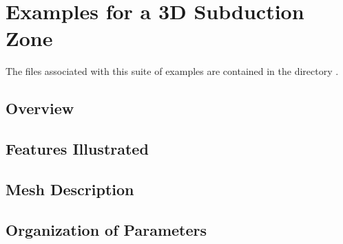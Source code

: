 \section{Examples for a 3D Subduction Zone}
\label{sec:example:subduction:3d}

The files associated with this suite of examples are contained in the
directory .


\subsection{Overview}







\subsection{Features Illustrated}

\subsection{Mesh Description}







\subsection{Organization of Parameters}




